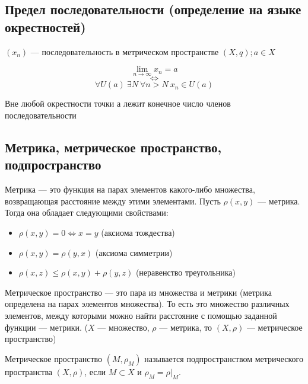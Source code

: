 \subsection{Предел последовательности (определение на языке окрестностей)}
    \begin{definition}
        $(x_n)$ --- последовательность в метрическом пространстве $(X, q); a \in X$
        
        $$\displaystyle \lim_{n \to \infty}{x_n} = a$$ $$\Leftrightarrow$$
        $$\forall U(a) \ \exists N \ \forall n > N \ x_n \in U(a)$$
    \end{definition}
    Вне любой окрестности точки $а$ лежит конечное число членов последовательности
\newpage
{}
\subsection{Метрика, метрическое пространство, подпространство}
    \begin{definition}
        Метрика --- это функция на парах элементов какого-либо множества, возвращающая расстояние между этими элементами. Пусть $\rho(x, y)$ --- метрика. Тогда она обладает следующими свойствами:
        \begin{itemize}
            \item 
            $\rho(x, y) = 0 \Leftrightarrow x = y$ (аксиома тождества)
            \item
            $\rho(x, y) = \rho(y, x)$ (аксиома симметрии)
            \item
            $\rho(x, z) \leq \rho(x, y) + \rho(y, z)$ (неравенство треугольника)
        \end{itemize}
    \end{definition}
    \begin{definition}
        Метрическое пространство --- это пара из множества и метрики (метрика определена на парах элементов множества). То есть это множество различных элементов, между которыми можно найти 
        расстояние с помощью заданной функции --- метрики. ($X$ --- множество, $\rho$ --- метрика, то $(X, \rho)$ --- метрическое пространство)
    \end{definition}
    \begin{definition}
        Метрическое пространство $(M, \rho_M)$ называется подпространством метрического пространства $(X, \rho)$, если $M \subset X$ и $\rho_M = \rho|_M$.
    \end{definition}
    
